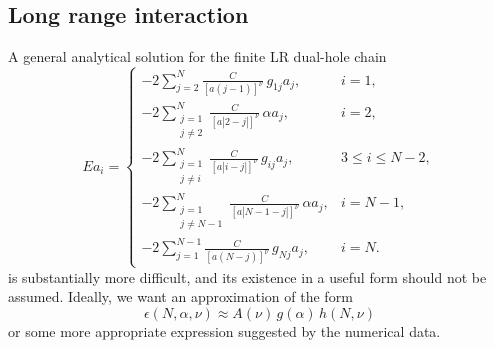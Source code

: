 \documentclass[../../../main.tex]{subfiles}
\begin{document}
\subsection{Long range interaction}
A general analytical solution for the finite LR dual-hole chain 
\begin{equation*}
  E a_i=
\begin{cases}
-2\sum_{j=2}^{N}
\frac{C}{[a(j-1)]^\nu}\,g_{1j}a_j,
& i=1,\\[1.2em]
-2\sum_{\substack{j=1\\j\neq 2}}^{N}
\frac{C}{[a|2-j|]^\nu}\,\alpha a_j,
& i=2,\\[1.2em]
-2\sum_{\substack{j=1\\j\neq i}}^{N}
\frac{C}{[a|i-j|]^\nu}\,g_{ij}a_j,
& 3\le i\le N-2,\\[1.2em]
-2\sum_{\substack{j=1\\j\neq N-1}}^{N}
\frac{C}{[a|N-1-j|]^\nu}\,\alpha a_j,
& i=N-1,\\[1.2em]
-2\sum_{j=1}^{N-1}
\frac{C}{[a(N-j)]^\nu}\,g_{Nj}a_j,
& i=N.
\end{cases}
\end{equation*}
is substantially more difficult, and its existence in a useful form should not be assumed.
Ideally, we want an approximation of the form
\begin{equation*}
  \epsilon(N,\alpha,\nu)\approx A(\nu)\,g(\alpha)\,h(N,\nu)
\end{equation*}
or some more appropriate expression suggested by the numerical data.
\end{document}
